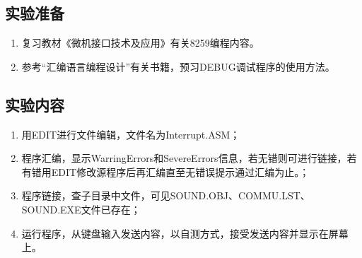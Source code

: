 \documentclass{ctexart}
\begin{document}
	\subsection{实验准备}%
	\label{sub:实验准备}

	\begin{enumerate}
		\item 复习教材《微机接口技术及应用》有关8259编程内容。
		\item 参考\enquote{汇编语言编程设计}有关书籍，预习DEBUG调试程序的使用方法。
	\end{enumerate}

	\subsection{实验内容}%
	\label{sub:实验内容}

	\begin{enumerate}
		\item 用EDIT进行文件编辑，文件名为Interrupt.ASM；
		\item 程序汇编，显示WarringErrors和SevereErrors信息，若无错则可进行链接，若有错用EDIT修改源程序后再汇编直至无错误提示通过汇编为止。；
		\item 程序链接，查子目录中文件，可见SOUND.OBJ、COMMU.LST、SOUND.EXE文件已存在；
		\item 运行程序，从键盘输入发送内容，以自测方式，接受发送内容并显示在屏幕上。
	\end{enumerate}

\end{document}
